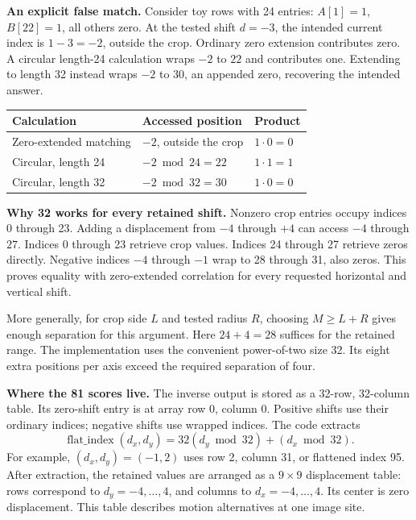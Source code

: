 \documentclass[11pt,letterpaper]{article}
\begin{document}
\textbf{An explicit false match.} Consider toy rows with 24 entries: $A[1]=1$, $B[22]=1$, all others zero. At the tested shift $d=-3$, the intended current index is $1-3=-2$, outside the crop. Ordinary zero extension contributes zero. A circular length-24 calculation wraps $-2$ to $22$ and contributes one. Extending to length 32 instead wraps $-2$ to $30$, an appended zero, recovering the intended answer.

\begin{center}\renewcommand{\arraystretch}{1.3}
\begin{tabular}{lll}\toprule
Calculation & Accessed position & Product\\\midrule
Zero-extended matching & $-2$, outside the crop & $1\cdot0=0$\\
Circular, length 24 & $-2\bmod24=22$ & $1\cdot1=1$\\
Circular, length 32 & $-2\bmod32=30$ & $1\cdot0=0$\\\bottomrule
\end{tabular}\end{center}

\textbf{Why 32 works for every retained shift.} Nonzero crop entries occupy indices 0 through 23. Adding a displacement from $-4$ through $+4$ can access $-4$ through $27$. Indices 0 through 23 retrieve crop values. Indices 24 through 27 retrieve zeros directly. Negative indices $-4$ through $-1$ wrap to 28 through 31, also zeros. This proves equality with zero-extended correlation for every requested horizontal and vertical shift.

More generally, for crop side $L$ and tested radius $R$, choosing $M\geq L+R$ gives enough separation for this argument. Here $24+4=28$ suffices for the retained range. The implementation uses the convenient power-of-two size 32. Its eight extra positions per axis exceed the required separation of four.

\textbf{Where the 81 scores live.} The inverse output is stored as a 32-row, 32-column table. Its zero-shift entry is at array row 0, column 0. Positive shifts use their ordinary indices; negative shifts use wrapped indices. The code extracts
\[
\operatorname{flat\_index}(d_x,d_y)=32(d_y\bmod32)+(d_x\bmod32).
\]
For example, $(d_x,d_y)=(-1,2)$ uses row 2, column 31, or flattened index 95. After extraction, the retained values are arranged as a $9\times9$ displacement table: rows correspond to $d_y=-4,\ldots,4$, and columns to $d_x=-4,\ldots,4$. Its center is zero displacement. This table describes motion alternatives at one image site.
\end{document}
